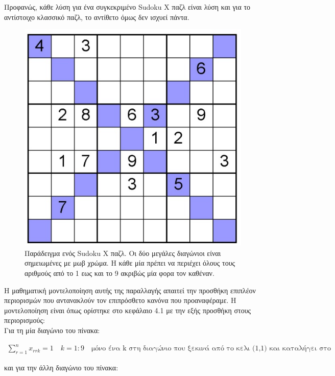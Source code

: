\documentclass[oneside,12pt]{book}
\theoremstyle{definition}
\begin{document}
Προφανώς, κάθε λύση για ένα συγκεκριμένο Sudoku X παζλ είναι λύση και για το αντίστοιχο κλασσικό παζλ, το αντίθετο όμως δεν ισχυεί πάντα. \par

\begin{figure}[h]
	\centering
	\includegraphics[scale=1.5]{Figures/sudokuX.jpg}
	\caption{Παράδειγμα ενός Sudoku X παζλ. Οι δύο μεγάλες διαγώνιοι είναι σημειωμένες με μωβ χρώμα. Η κάθε μία πρέπει να περιέχει όλους τους αριθμούς από το 1 εως και το 9 ακριβώς μία φορα τον καθέναν.}
\end{figure}

Η μαθηματική μοντελοποίηση αυτής της παραλλαγής απαιτεί την προσθήκη επιπλέον περιορισμών που αντανακλούν τον επιπρόσθετο κανόνα που προαναφέραμε. Η μοντελοποίηση είναι όπως ορίστηκε στο κεφάλαιο 4.1 με την εξής προσθήκη στους περιορισμούς: \\

Για τη μία διαγώνιο του πίνακα:

\begin{align*}
	\sum_{r=1}^{n} x_{rrk} = 1 \quad k=1:9 \quad \text{μόνο ένα k στη διαγώνιο που ξεκινά από το κελι (1,1) και καταλήγει στο κελι (n,n)}
\end{align*}

και για την άλλη διαγώνιο του πίνακα:
\end{document}
